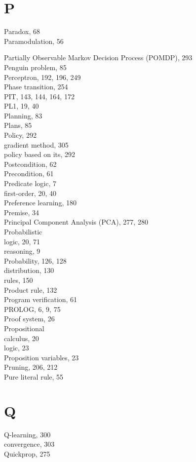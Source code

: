 \documentclass[10pt]{book}
\begin{document}
\section*{P}
Paradox, 68\\
Paramodulation, 56


Partially Observable Markov Decision Process (POMDP), 293\\
Penguin problem, 85\\
Perceptron, 192, 196, 249\\
Phase transition, 254\\
PIT, 143, 144, 164, 172\\
PL1, 19, 40\\
Planning, 83\\
Plans, 85\\
Policy, 292\\
gradient method, 305\\
policy based on its, 292\\
Postcondition, 62\\
Precondition, 61\\
Predicate logic, 7\\
first-order, 20, 40\\
Preference learning, 180\\
Premise, 34\\
Principal Component Analysis (PCA), 277, 280\\
Probabilistic\\
logic, 20, 71\\
reasoning, 9\\
Probability, 126, 128\\
distribution, 130\\
rules, 150\\
Product rule, 132\\
Program verification, 61\\
PROLOG, 6, 9, 75\\
Proof system, 26\\
Propositional\\
calculus, 20\\
logic, 23\\
Proposition variables, 23\\
Pruning, 206, 212\\
Pure literal rule, 55

\section*{Q}
Q-learning, 300\\
convergence, 303\\
Quickprop, 275
\end{document}
